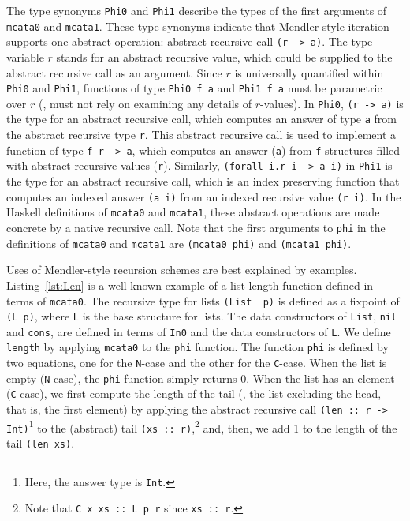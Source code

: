 The type synonyms \lstinline{Phi0} and \lstinline{Phi1} describe the types of
the first arguments of \lstinline{mcata0} and \lstinline{mcata1}.
These type synonyms indicate that Mendler-style iteration supports
one abstract operation: abstract recursive call \lstinline{(r -> a)}.
The type variable $r$ stands for an abstract recursive value, which could
be supplied to the abstract recursive call as an argument. Since $r$ is
universally quantified within \lstinline{Phi0} and \lstinline{Phi1},
functions of type \lstinline{Phi0 f a} and \lstinline{Phi1 f a} must be
parametric over $r$ (\ie, must not rely on examining any details of $r$-values).
In \lstinline{Phi0}, \lstinline{(r -> a)} is the type for
an abstract recursive call, which computes an answer of type \lstinline{a}
from the abstract recursive type \lstinline{r}.
This abstract recursive call is used to implement a function of type
\lstinline{f r -> a}, which computes an answer (\lstinline{a}) from
\lstinline{f}-structures filled with abstract recursive values (\lstinline{r}).
Similarly, \lstinline{(forall i.r i -> a i)} in \lstinline{Phi1} is the type
for an abstract recursive call, which is an index preserving function that
computes an indexed answer \lstinline{(a i)} from an indexed recursive value
\lstinline{(r i)}. In the Haskell definitions of \lstinline{mcata0} and
\lstinline{mcata1}, these abstract operations are made concrete by
a native recursive call. Note that the first arguments to
\lstinline{phi} in the definitions of \lstinline{mcata0} and \lstinline{mcata1}
are \lstinline{(mcata0 phi)} and \lstinline{(mcata1 phi)}.

Uses of Mendler-style recursion schemes are best explained by examples.
Listing~\ref{lst:Len} is a well-known example of a list length function
defined in terms of \lstinline{mcata0}. The recursive type for lists
\lstinline{(List  p)} is defined as a fixpoint of \lstinline{(L p)},
where \lstinline{L} is the base structure for lists. The data constructors
of \lstinline{List}, \lstinline{nil} and \lstinline{cons}, are defined
in terms of \lstinline{In0} and the data constructors of \lstinline{L}.
We define \lstinline{length} by applying \lstinline{mcata0} to
the \lstinline{phi} function. The function \lstinline{phi} is defined
by two equations, one for the \lstinline{N}-case and the other for
the \lstinline{C}-case. When the list is empty (\lstinline{N}-case),
the \lstinline{phi} function simply returns 0. When the list has an
element (\lstinline{C}-case), we first compute the length of the tail
(\ie, the list excluding the head, that is, the first element) by
applying the abstract recursive call \lstinline{(len :: r -> Int)}\footnote{
	Here, the answer type is \lstinline{Int}. }
to the (abstract) tail \lstinline{(xs :: r)},\footnote{
	Note that \lstinline{C x xs :: L p r} since \lstinline{xs :: r}.}
and, then, we add 1 to the length of the tail \lstinline{(len xs)}.

